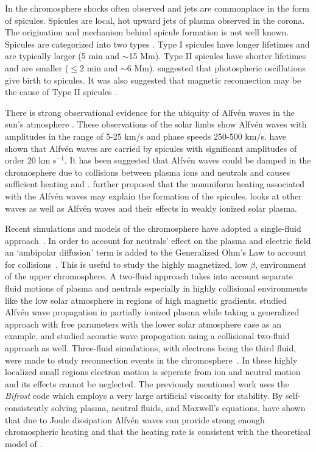 \documentclass[12pt,upcase]{umlthesis}
\begin{document}
In the chromosphere shocks often observed and jets are commonplace in the form of spicules. Spicules are local, hot upward jets of plasma observed in the corona. The origination and mechanism behind spicule formation is not well known. Spicules are categorized into two types \citep{Pontieu2007}. Type I spicules have longer lifetimes and are typically larger (5 min and $\sim$15 Mm). Type II spicules have shorter lifetimes and are smaller ($\leq$2 min and $\sim$6 Mm). \citet{Pontieu2004} suggested that photospheric oscillations give birth to spicules. It was also suggested that magnetic reconnection may be the cause of Type II spicules \citep{Pontieu2007}.

There is strong observational evidence for the ubiquity of Alfv\'en waves in the sun's atmosphere \citep{Mathioudakis2013,McIntosh2011,Jess2009,Ofman2008,Aschwanden1999,Nakariakov1999}. These observations of the solar limbs show Alfv\'en waves with amplitudes in the range of 5-25 km/s and phase speeds 250-500 km/s.  \citet{Pontieu2007} have shown that Alfv\'en waves are carried by spicules with significant amplitudes of order 20 km s$^{-1}$. It has been suggested that Alfv\'en waves could be damped in the chromosphere due to collisions between plasma ions and neutrals and causes sufficient heating \citep{Song2011} and \citep{Song2014}. \citet{Song2017} further proposed that the nonuniform heating associated with the Alfv\'en waves may explain the formation of the spicules. \citet{Khomenko2017} looks at other waves as well as Alfv\'en waves and their effects in weakly ionized solar plasma. %

Recent simulations and models of the chromosphere have adopted a single-fluid approach~\citep{Kuzma2017,Ni2016,BradyArber2016,Gudiksen2011}. In order to account for neutrals' effect on the plasma and electric field an `ambipolar diffusion' term is added to the Generalized Ohm's Law to account for collisions~\citep{Martinez-Sykora2012,Martinez-Sykora2017}. This is useful to study the highly magnetized, low $\beta$, environment of the upper chromosphere. A two-fluid approach takes into account separate fluid motions of plasma and neutrals especially in highly collisional environments like the low solar atmosphere in regions of high magnetic gradients. \citet{Soler2013} studied Alfv\'en wave propagation in partially ionized plasma while taking a generalized approach with free parameters with the lower solar atmosphere case as an example. \citet{Maneva2017} and \citet{Wojcik2018} studied acoustic wave propogation using a collisional two-fluid approach as well. Three-fluid simulations, with electrons being the third fluid, were made to study reconnection events in the chromosphere~\citep{Leake2013}. In these highly localized small regions electron motion is seperate from ion and neutral motion and its effects cannot be neglected. The previously mentioned work uses the {\it Bifrost\/} \citep{Gudiksen2011} code which employs a very large artificial viscosity for stability. By self-consistently solving plasma, neutral fluids, and Maxwell's equations, \citet{Tu2013} have shown that due to Joule dissipation Alfv\'en waves can provide strong enough chromospheric heating and that the heating rate is consistent with the theoretical model of \citet{Song2011}.
\end{document}
